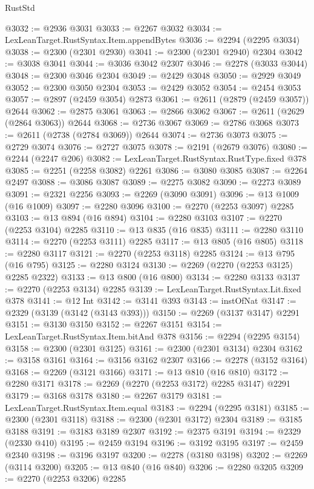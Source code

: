 \begin{lexlean}{RustStd}
\begin{coremodule}
{\begin{coremodule}
{{{{{{{{{{{{@3032 := @2936 @3031
@3033 := @2267 @3032
@3034 := LexLeanTarget.RustSyntax.Item.appendBytes
@3036 := @2294 (@2295 @3034)
@3038 := @2300 (@2301 @2930)
@3041 := @2300 (@2301 @2940) @2304
@3042 := @3038 @3041
@3044 := @3036 @3042 @2307
@3046 := @2278 (@3033 @3044)
@3048 := @2300 @3046 @2304
@3049 := @2429 @3048
@3050 := @2929 @3049
@3052 := @2300 @3050 @2304
@3053 := @2429 @3052
@3054 := @2454 @3053
@3057 := @2897 (@2459 @3054) @2873
@3061 := @2611 (@2879 (@2459 @3057)) @2644
@3062 := @2875 @3061
@3063 := @2866 @3062
@3067 := @2611 (@2629 (@2864 @3063)) @2644
@3068 := @2736 @3067
@3069 := @2786 @3068
@3073 := @2611 (@2738 (@2784 @3069)) @2644
@3074 := @2736 @3073
@3075 := @2729 @3074
@3076 := @2727 @3075
@3078 := @2191 (@2679 @3076)
@3080 := @2244 (@2247 @206)
@3082 := LexLeanTarget.RustSyntax.RustType.fixed @378
@3085 := @2251 (@2258 @3082) @2261
@3086 := @3080 @3085
@3087 := @2264 @2497
@3088 := @3086 @3087
@3089 := @2275 @3082
@3090 := @2273 @3089
@3091 := @2321 @2256
@3093 := @2269 (@3090 @3091)
@3096 := @13 @1009 (@16 @1009)
@3097 := @2280 @3096
@3100 := @2270 (@2253 @3097) @2285
@3103 := @13 @894 (@16 @894)
@3104 := @2280 @3103
@3107 := @2270 (@2253 @3104) @2285
@3110 := @13 @835 (@16 @835)
@3111 := @2280 @3110
@3114 := @2270 (@2253 @3111) @2285
@3117 := @13 @805 (@16 @805)
@3118 := @2280 @3117
@3121 := @2270 (@2253 @3118) @2285
@3124 := @13 @795 (@16 @795)
@3125 := @2280 @3124
@3130 := @2269 (@2270 (@2253 @3125) @2285 @2322)
@3133 := @13 @800 (@16 @800)
@3134 := @2280 @3133
@3137 := @2270 (@2253 @3134) @2285
@3139 := LexLeanTarget.RustSyntax.Lit.fixed @378
@3141 := @12 Int
@3142 := @3141 @393
@3143 := instOfNat
@3147 := @2329 (@3139 (@3142 (@3143 @393)))
@3150 := @2269 (@3137 @3147) @2291
@3151 := @3130 @3150
@3152 := @2267 @3151
@3154 := LexLeanTarget.RustSyntax.Item.bitAnd @378
@3156 := @2294 (@2295 @3154)
@3158 := @2300 (@2301 @3125)
@3161 := @2300 (@2301 @3134) @2304
@3162 := @3158 @3161
@3164 := @3156 @3162 @2307
@3166 := @2278 (@3152 @3164)
@3168 := @2269 (@3121 @3166)
@3171 := @13 @810 (@16 @810)
@3172 := @2280 @3171
@3178 := @2269 (@2270 (@2253 @3172) @2285 @3147) @2291
@3179 := @3168 @3178
@3180 := @2267 @3179
@3181 := LexLeanTarget.RustSyntax.Item.equal
@3183 := @2294 (@2295 @3181)
@3185 := @2300 (@2301 @3118)
@3188 := @2300 (@2301 @3172) @2304
@3189 := @3185 @3188
@3191 := @3183 @3189 @2307
@3192 := @2375 @3191
@3194 := @2329 (@2330 @410)
@3195 := @2459 @3194
@3196 := @3192 @3195
@3197 := @2459 @2340
@3198 := @3196 @3197
@3200 := @2278 (@3180 @3198)
@3202 := @2269 (@3114 @3200)
@3205 := @13 @840 (@16 @840)
@3206 := @2280 @3205
@3209 := @2270 (@2253 @3206) @2285
}}}}}}}}}}}}
\end{coremodule}}
\end{coremodule}
\end{lexlean}
